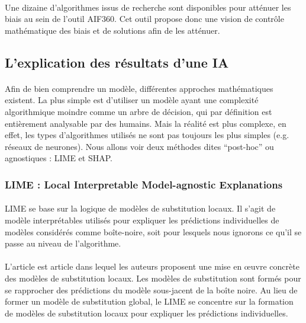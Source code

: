 \documentclass[10pt, french, a4paper]{report}
\begin{document}
\paragraph{}
Une dizaine d’algorithmes issus de recherche sont disponibles pour atténuer les biais au sein de l’outil AIF360. Cet outil propose donc une vision de contrôle mathématique des biais et de solutions afin de les atténuer.

\subsection{L'explication des résultats d'une IA}

\paragraph{}
Afin de bien comprendre un modèle, différentes approches mathématiques existent. La plus simple est d'utiliser un modèle ayant une complexité algorithmique moindre comme un arbre de décision, qui par définition est entièrement analysable par des humains. Mais la réalité est plus complexe, en effet, les types d'algorithmes utilisés ne sont pas toujours les plus simples (e.g. réseaux de neurones). Nous allons voir deux méthodes dites ``post-hoc'' ou agnostiques : LIME et SHAP.

\subsubsection{LIME : Local Interpretable Model-agnostic Explanations}

\paragraph{}
LIME se base sur la logique de modèles de substitution locaux. Il s'agit de modèle interprétables utilisés pour expliquer les prédictions individuelles de modèles considérés comme boîte-noire, soit pour lesquels nous ignorons ce qu'il se passe au niveau de l'algorithme.

\paragraph{}
L'article \citep{lime} est article dans lequel les auteurs proposent une mise en œuvre concrète des modèles de substitution locaux. Les modèles de substitution sont formés pour se rapprocher des prédictions du modèle sous-jacent de la boîte noire. Au lieu de former un modèle de substitution global, le LIME se concentre sur la formation de modèles de substitution locaux pour expliquer les prédictions individuelles.
\end{document}
